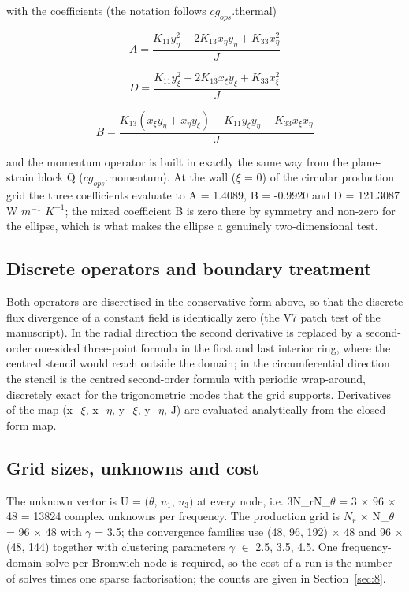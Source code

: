 \documentclass[preprint,12pt]{elsarticle}
\begin{document}
with the coefficients (the notation follows $cg_{ops}$.thermal)

\begin{equation}
A=\frac{K_{11}y_\eta^2-2K_{13}x_\eta y_\eta+K_{33}x_\eta^2}{J} 
\label{eq:15}
\end{equation}

\begin{equation}
D=\frac{K_{11}y_\xi^2-2K_{13}x_\xi y_\xi+K_{33}x_\xi^2}{J} 
\label{eq:16}
\end{equation}

\begin{equation}
B=\frac{K_{13}\left(x_\xi y_\eta+x_\eta y_\xi\right)-K_{11}y_\xi y_\eta-K_{33}x_\xi x_\eta}{J} 
\label{eq:17}
\end{equation}

and the momentum operator is built in exactly the same way from the plane-strain block Q ($cg_{ops}$.momentum). At the wall ($\xi$ = 0) of the circular production grid the three coefficients evaluate to A = 1.4089, B = -0.9920 and D = 121.3087 W $m^{-1}$ $K^{-1}$; the mixed coefficient B is zero there by symmetry and non-zero for the ellipse, which is what makes the ellipse a genuinely two-dimensional test.

\subsection{Discrete operators and boundary treatment}
\label{sec:6.3}

Both operators are discretised in the conservative form above, so that the discrete flux divergence of a constant field is identically zero (the V7 patch test of the manuscript). In the radial direction the second derivative is replaced by a second-order one-sided three-point formula in the first and last interior ring, where the centred stencil would reach outside the domain; in the circumferential direction the stencil is the centred second-order formula with periodic wrap-around, discretely exact for the trigonometric modes that the grid supports. Derivatives of the map (x\_$\xi$, x\_$\eta$, y\_$\xi$, y\_$\eta$, J) are evaluated analytically from the closed-form map.

\subsection{Grid sizes, unknowns and cost}
\label{sec:6.4}

The unknown vector is U = ($\theta$, $u_{1}$, $u_{3}$) at every node, i.e. 3N\_rN\_$\theta$ = 3 $\times$ 96 $\times$ 48 = 13824 complex unknowns per frequency. The production grid is $N_{r}$ $\times$ N\_$\theta$ = 96 $\times$ 48 with $\gamma$ = 3.5; the convergence families use (48, 96, 192) $\times$ 48 and 96 $\times$ (48, 144) together with clustering parameters $\gamma$ $\in$ {2.5, 3.5, 4.5}. One frequency-domain solve per Bromwich node is required, so the cost of a run is the number of solves times one sparse factorisation; the counts are given in Section~\ref{sec:8}.
\end{document}
